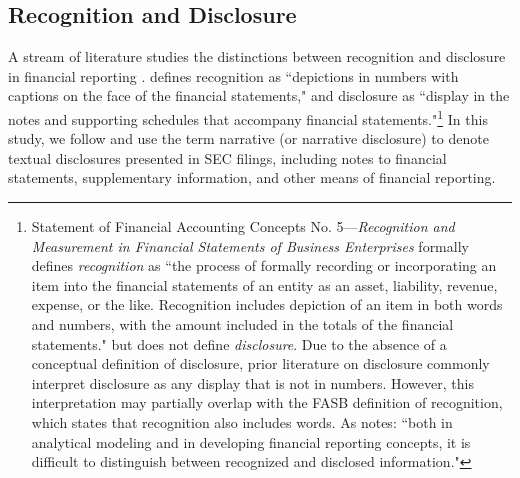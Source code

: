 \documentclass[letterpaper,12pt]{article}
\begin{document}
\begin{spacing}{1.5}
\subsection{Recognition and Disclosure}
\noindent A stream of literature studies the distinctions between recognition and disclosure in financial reporting \cite{aboodyRecognitionDisclosureOil1996, barthMarketEffectsRecognition2003, schipperRequiredDisclosuresFinancial2007}.  defines recognition as ``depictions in numbers with captions on the face of the financial statements," and disclosure as ``display in the notes and supporting schedules that accompany financial statements."\footnote{Statement of Financial Accounting Concepts No. 5---\textit{Recognition and Measurement in Financial Statements of Business Enterprises} formally defines \textit{recognition} as ``the process of formally recording or incorporating an item into the financial statements of an entity as an asset, liability, revenue, expense, or the like. Recognition includes depiction of an item in both words and numbers, with the amount included in the totals of the financial statements." \cite[par. 6]{fasbStatementFinancialAccounting1984} but does not define \textit{disclosure}. Due to the absence of a conceptual definition of disclosure, prior literature on disclosure commonly interpret disclosure as any display that is not in numbers. However, this interpretation may partially overlap with the FASB definition of recognition, which states that recognition also includes words. As  notes: ``both in analytical modeling and in developing financial reporting concepts, it is difficult to distinguish between recognized and disclosed information."} In this study, we follow  and use the term narrative (or narrative disclosure) to denote textual disclosures presented in SEC filings, including notes to financial statements, supplementary information, and other means of financial reporting.


\end{spacing}
\end{document}
